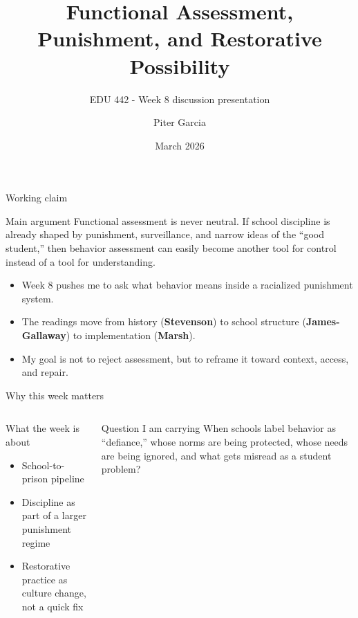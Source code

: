 \documentclass[aspectratio=169,11pt]{beamer}
\title{Functional Assessment, Punishment, and Restorative Possibility}
\subtitle{EDU 442 - Week 8 discussion presentation}
\author{Piter Garcia}
\date{March 2026}
\begin{document}
\begin{frame}
  \titlepage
\end{frame}

\begin{frame}{Working claim}
\begin{block}{Main argument}
Functional assessment is never neutral. If school discipline is already shaped by punishment, surveillance, and narrow ideas of the ``good student,'' then behavior assessment can easily become another tool for control instead of a tool for understanding.
\end{block}

\vspace{0.4cm}
\begin{itemize}
  \item Week 8 pushes me to ask what behavior means inside a racialized punishment system.
  \item The readings move from history (\textbf{Stevenson}) to school structure (\textbf{James-Gallaway}) to implementation (\textbf{Marsh}).
  \item My goal is not to reject assessment, but to reframe it toward context, access, and repair.
\end{itemize}
\end{frame}

\begin{frame}{Why this week matters}
\begin{columns}[T]
  \begin{block}{What the week is about}
  \begin{itemize}
    \item School-to-prison pipeline
    \item Discipline as part of a larger punishment regime
    \item Restorative practice as culture change, not a quick fix
  \end{itemize}
  \end{block}

  \begin{block}{Question I am carrying}
  When schools label behavior as ``defiance,'' whose norms are being protected, whose needs are being ignored, and what gets misread as a student problem?
  \end{block}
\end{columns}
\end{frame}
\end{document}
